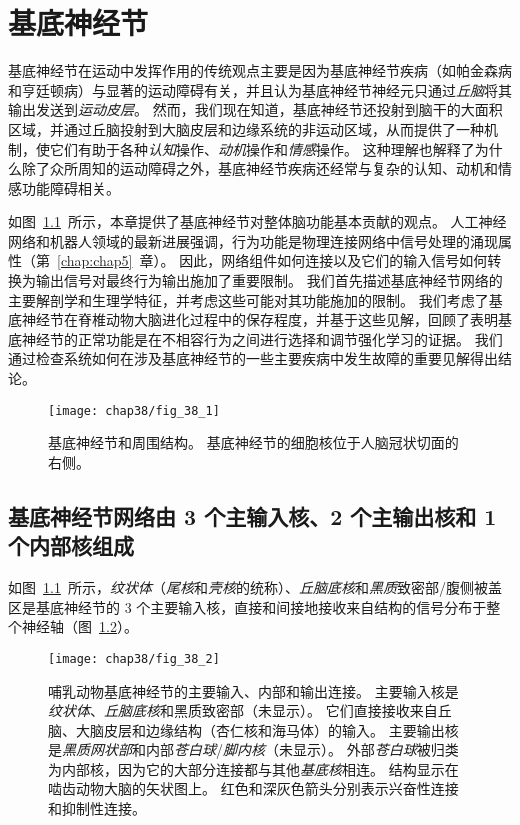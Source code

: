 \chapter{基底神经节} \label{chap:chap38}

基底神经节在运动中发挥作用的传统观点主要是因为基底神经节疾病（如帕金森病和亨廷顿病）与显著的运动障碍有关，并且认为基底神经节神经元只通过\textit{丘脑}将其输出发送到\textit{运动皮层}。
然而，我们现在知道，基底神经节还投射到脑干的大面积区域，并通过丘脑投射到大脑皮层和边缘系统的非运动区域，从而提供了一种机制，使它们有助于各种\textit{认知}操作、\textit{动机}操作和\textit{情感}操作。
这种理解也解释了为什么除了众所周知的运动障碍之外，基底神经节疾病还经常与复杂的认知、动机和情感功能障碍相关。




如图~\ref{fig:38_1}~所示，本章提供了基底神经节对整体脑功能基本贡献的观点。
人工神经网络和机器人领域的最新进展强调，行为功能是物理连接网络中信号处理的涌现属性（第~\ref{chap:chap5}~章）。
因此，网络组件如何连接以及它们的输入信号如何转换为输出信号对最终行为输出施加了重要限制。
我们首先描述基底神经节网络的主要解剖学和生理学特征，并考虑这些可能对其功能施加的限制。
我们考虑了基底神经节在脊椎动物大脑进化过程中的保存程度，并基于这些见解，回顾了表明基底神经节的正常功能是在不相容行为之间进行选择和调节强化学习的证据。
我们通过检查系统如何在涉及基底神经节的一些主要疾病中发生故障的重要见解得出结论。


\begin{figure}[htbp]
	\centering
	\texttt{[image: chap38/fig\_38\_1]}
	\caption{基底神经节和周围结构。
		基底神经节的细胞核位于人脑冠状切面的右侧\cite{nieuwenhuys2007human}。}
	\label{fig:38_1}
\end{figure}



\section{基底神经节网络由 3 个主输入核、2 个主输出核和 1 个内部核组成}

如图~\ref{fig:38_1}~所示，\textit{纹状体}（\textit{尾核}和\textit{壳核}的统称）、\textit{丘脑底核}和\textit{黑质}致密部/腹侧被盖区是基底神经节的 3 个主要输入核，直接和间接地接收来自结构的信号分布于整个神经轴（图~\ref{fig:38_2}）。


\begin{figure}[htbp]
	\centering
	\texttt{[image: chap38/fig\_38\_2]}
	\caption{哺乳动物基底神经节的主要输入、内部和输出连接。
		主要输入核是\textit{纹状体}、\textit{丘脑底核}和黑质致密部（未显示）。
		它们直接接收来自丘脑、大脑皮层和边缘结构（杏仁核和海马体）的输入。
		主要输出核是\textit{黑质网状部}和内部\textit{苍白球}/\textit{脚内核}（未显示）。
		外部\textit{苍白球}被归类为内部核，因为它的大部分连接都与其他\textit{基底核}相连。
		结构显示在啮齿动物大脑的矢状图上。
		红色和深灰色箭头分别表示兴奋性连接和抑制性连接。}
	\label{fig:38_2}
\end{figure}



